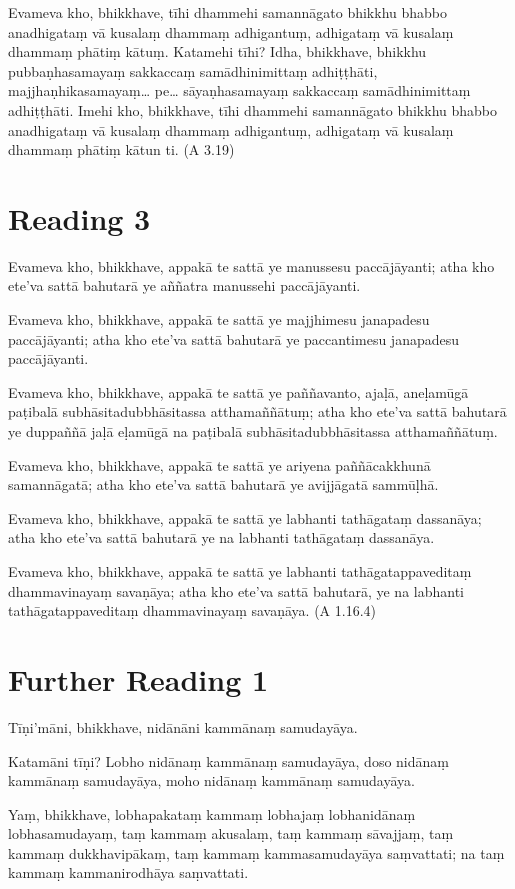 Evameva kho, bhikkhave, tīhi dhammehi samannāgato bhikkhu bhabbo anadhigataṃ vā kusalaṃ dhammaṃ adhigantuṃ, adhigataṃ vā kusalaṃ dhammaṃ phātiṃ kātuṃ. Katamehi tīhi? Idha, bhikkhave, bhikkhu pubbaṇhasamayaṃ sakkaccaṃ samādhinimittaṃ adhiṭṭhāti, majjhaṇhikasamayaṃ… pe… sāyaṇhasamayaṃ sakkaccaṃ samādhinimittaṃ adhiṭṭhāti. Imehi kho, bhikkhave, tīhi dhammehi samannāgato bhikkhu bhabbo anadhigataṃ vā kusalaṃ dhammaṃ adhigantuṃ, adhigataṃ vā kusalaṃ dhammaṃ phātiṃ kātun ti. (A 3.19)

\section*{Reading 3}

Evameva kho, bhikkhave, appakā te sattā ye manussesu paccājāyanti; atha kho ete’va sattā bahutarā ye aññatra manussehi paccājāyanti.

Evameva kho, bhikkhave, appakā te sattā ye majjhimesu janapadesu paccājāyanti; atha kho ete’va sattā bahutarā ye paccantimesu janapadesu paccājāyanti.

Evameva kho, bhikkhave, appakā te sattā ye paññavanto, ajaḷā, aneḷamūgā paṭibalā subhāsitadubbhāsitassa atthamaññātuṃ; atha kho ete’va sattā bahutarā ye duppaññā jaḷā eḷamūgā na paṭibalā subhāsitadubbhāsitassa atthamaññātuṃ.

Evameva kho, bhikkhave, appakā te sattā ye ariyena paññācakkhunā samannāgatā; atha kho ete’va sattā bahutarā ye avijjāgatā sammūḷhā.

Evameva kho, bhikkhave, appakā te sattā ye labhanti tathāgataṃ dassanāya; atha kho ete’va sattā bahutarā ye na labhanti tathāgataṃ dassanāya.

Evameva kho, bhikkhave, appakā te sattā ye labhanti tathāgatappaveditaṃ dhammavinayaṃ savaṇāya; atha kho ete’va sattā bahutarā, ye na labhanti tathāgatappaveditaṃ dhammavinayaṃ savaṇāya. (A 1.16.4)

\section*{Further Reading 1}

Tīṇi’māni, bhikkhave, nidānāni kammānaṃ samudayāya.

Katamāni tīṇi? Lobho nidānaṃ kammānaṃ samudayāya, doso nidānaṃ kammānaṃ samudayāya, moho nidānaṃ kammānaṃ samudayāya.

Yaṃ, bhikkhave, lobhapakataṃ kammaṃ lobhajaṃ lobhanidānaṃ lobhasamudayaṃ, taṃ kammaṃ akusalaṃ, taṃ kammaṃ sāvajjaṃ, taṃ kammaṃ dukkhavipākaṃ, taṃ kammaṃ kammasamudayāya saṃvattati; na taṃ kammaṃ kammanirodhāya saṃvattati.

